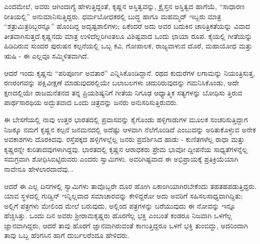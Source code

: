 ಎಂದಮೇಲೆ, ಅವರು ಆಗಿಂದಾಗ್ಯೆ ಹೇಳುತ್ತಿದ್ದಂತೆ, ಕೃಷ್ಣನ ಅಸ್ತಿತ್ವವನ್ನು, ಕ್ರೈಸ್ತನ ಅಸ್ತಿತ್ವದ ಹಾಗೆಯೆ, “ಸಾಧಾರಣ ರೀತಿಯಲ್ಲಿ” ಅನುಮಾನಿಸುತ್ತಿದ್ದರು. ಧರ್ಮಬೋಧಕರಲ್ಲಿ ಬುದ್ಧ ಹಾಗೂ ಮಹಮ್ಮದ್ ಇಬ್ಬರು ಮಾತ್ರ “ಶತ್ರುಮಿತ್ರರಿಬ್ಬರನ್ನೂ” ಹೊಂದಿದ್ದ ಅದೃಷ್ಟಶಾಲಿಗಳು; ಏಕೆಂದರೆ ಅದು ಅವರ ಬದುಕಿನ ಚಾರಿತ್ರಿಕತೆಯನ್ನು ವಿವಾದ ತೀತವಾಗಿಸುತ್ತದೆ.ಕೃಷ್ಣನದು ಮಾತ್ರ ಉಳಿದೆಲ್ಲರಿಗಿಂತಲೂ ವಿಶಿಷ್ಟವಾದ ಒಂದು ಛಾಯಾ ರೂಪ. ಕೈಯಲ್ಲಿ ಗೀತೆಯನ್ನು ಹಿಡಿದಿರುವ ಸುಂದರ ಪುರುಷನ ಕಲ್ಪನೆಯಲ್ಲಿ ಒಬ್ಬ ಕವಿ, ಗೋಪಾಲಕ, ರಾಜ್ಯವಾಳುವ ದೊರೆ, ಮಹಾಯೋಧ ಮತ್ತು ಋಷಿ - ಈ ಎಲ್ಲವೂ ಸಮ್ಮಿಳಿತವಾಗಿದೆ.

ಆದರೆ ಇಂದು ಕೃಷ್ಣನು “ಪರಿಪೂರ್ಣ ಅವತಾರ” ಎನ್ನಿಸಿಕೊಂಡಿದ್ದಾನೆ. ರಥದ ಕುದುರೆಗಳ ಲಗಾಮನ್ನು ನಿಯಂತ್ರಿಸುತ್ತ, ರಣರಂಗವನ್ನು ಪಕ್ಷಿವೀಕ್ಷಣೆ ಮಾಡುವುದರಲ್ಲಿಯೇ ಬಲಾಬಲಗಳು ಚದುರಿರುವುದನ್ನು ಗಮನಿಸಿಕೊಂಡು, ಅದೇ ಕ್ಷಣದಲ್ಲಿಯೇ ರಾಜಮನೆತನದ ತನ್ನ ಪ್ರಿಯಶಿಷ್ಯನಿಗೆ ಗೀತೆಯ ನಿಗೂಢ ಆಧ್ಯಾತ್ಮಿಕ ಸತ್ಯಗಳನ್ನು ಬೋಧಿಸು ತ್ತಿರುವ ಪಾರ್ಥಸಾರಥಿಯ ಅದ್ಭುತವಾದ ಒಂದು ಚಿತ್ರವನ್ನು ಜನರು ಅನುಸರಿಸುತ್ತಿರುವರು.

ಈ ಬೇಸಗೆಯಲ್ಲಿ ನಾವು ಉತ್ತರ ಭಾರತದಲ್ಲಿ ಪ್ರವಾಸವನ್ನು ಕೈಗೊಂಡು ಹಳ್ಳಿಗಾಡುಗಳ ಮೂಲಕ ಸಂಚರಿಸುತ್ತಿದ್ದಾಗ ನಿಜಕ್ಕೂ ನಮಗೆ ಕೃಷ್ಣನ ಕಲ್ಪನೆ ಜನಮನದಲ್ಲಿ ಅದೆಷ್ಟು ಆಳವಾಗಿ ನೆಲೆಗೊಂಡಿದೆ ಎಂಬುದನ್ನು ಅರಿತುಕೊಳ್ಳುವ ಅನೇಕ ಅವಕಾಶಗಳು ದೊರಕಿದವು. ರಸ್ತೆಪಕ್ಕದ ಹಳ್ಳಿಗಳಲ್ಲೆಲ್ಲ ಜನರು ಪ್ರದರ್ಶಿಸಿದ ಹಾಡು - ಕುಣಿತಗಳೆಲ್ಲ ರಾಧಾ ಮತ್ತು ಕೃಷ್ಣರನ್ನೇ ಕುರಿತಾದವುಗಳಾಗಿದ್ದವು. ಭಾರತದಲ್ಲಿ ಕೃಷ್ಣನ ಆರಾಧಕರು ಪ್ರೇಮ ಭಾವೋ ದ್ದೀಪನೆಯ ಸಾಧ್ಯತೆಗಳನ್ನೆಲ್ಲ ಸಮಗ್ರವಾಗಿ ಶೋಧಿಸಿಬಿಟ್ಟಿರುವರು ಎಂದರು ಸ್ವಾಮಿಗಳು. ಅವರಿಗಿಷ್ಟವಾದ ಈ ಅಭಿಪ್ರಾಯಕ್ಕೆ ಪ್ರತಿಕ್ರಿಯೆಯಾಗಿ ನಾವೇನೂ ಹೇಳಲಾರದಾದೆವು...

ಆದರೆ ಈ ಎಲ್ಲ ದಿನಗಳಲ್ಲಿ ಸ್ವಾಮಿಗಳು ತಾವೊಬ್ಬರೇ ದೂರ ಹೋಗಿ ಏಕಾಂಗಿಯಾಗಿರಬೇಕೆಂದು ತಹತಹಪಡುತ್ತಿದ್ದರು. ಯಾವ ಸ್ಥಳದಲ್ಲಿ ಗುಡ್ವಿನ್ ಇನ್ನಿಲ್ಲವಾದ ಸಮಾಚಾರವನ್ನು ಕೇಳಿದ್ದರೋ ಅದು ಅವರಿಗೆ ಸಹಿಸಲಸಾಧ್ಯವಾಗಿದ್ದಿತು; ಅಲ್ಲಿಗೆ ಪತ್ರಗಳು ಮೇಲಿಂದ ಮೇಲೆ ಬರುವುದು, ಅಲ್ಲಿಂದ ಪತ್ರಗಳನ್ನು ಬರೆಯುವುದು ಈ ನೋವನ್ನು ಇನ್ನೂ ಹೆಚ್ಚಿಸಿತ್ತು. ಒಂದು ದಿನ ಅವರು ಶ‍್ರೀರಾಮಕೃಷ್ಣರು ಹೊರಗೆಲ್ಲ ಭಕ್ತಿ ಎಂಬಂತೆ ಕಂಡರೂ ನಿಜವಾಗಿ ಒಳಗೆಲ್ಲ ಜ್ಞಾನವಾಗಿದ್ದರು, ಆದರೆ ತಾವು ಹೊರಗೆ ಜ್ಞಾನವಾಗಿರುವಂತೆ ಕಾಣುತ್ತಿದ್ದರೂ ಒಳಗೆ ಭಕ್ತಿ ತುಂಬಿದ್ದು, ಅದರಿಂದಾಗಿ ತಾವು ಒಬ್ಬ ಹೆಂಗಸಿನ ಹಾಗೆ ದುರ್ಬಲರೆಂದೂ ಹೇಳಿದರು.

